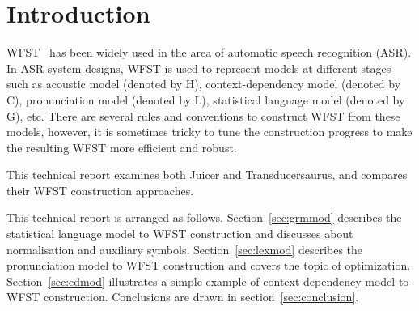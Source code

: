 \section{Introduction}
\label{sec:intro}

WFST~\cite{mohri2008speech, mohri2009weighted} has been widely used in the area of automatic speech recognition (ASR). In ASR system designs, WFST is used to represent models at different stages such as acoustic model (denoted by H), context-dependency model (denoted by C), pronunciation model (denoted by L), statistical language model (denoted by G), etc. There are several rules and conventions to construct WFST from these models, however, it is sometimes tricky to tune the construction progress to make the resulting WFST more efficient and robust.

This technical report examines both Juicer and Transducersaurus, and compares their WFST construction approaches.

This technical report is arranged as follows. 
Section~\ref{sec:grmmod} describes the statistical language model to WFST construction and discusses about normalisation and auxiliary symbols.
Section~\ref{sec:lexmod} describes the pronunciation model to WFST construction and covers the topic of optimization.
Section~\ref{sec:cdmod} illustrates a simple example of context-dependency model to WFST construction.
Conclusions are drawn in section~\ref{sec:conclusion}.
